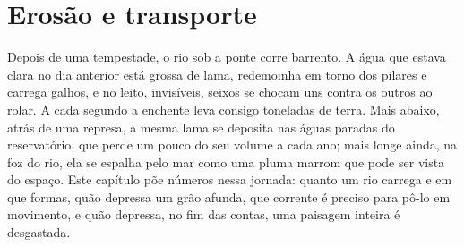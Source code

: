 \chapter{Erosão e transporte}\label{ch:b1:erosion-transport}

Depois de uma tempestade, o rio sob a ponte corre barrento. A água que estava clara no dia anterior está grossa de lama, redemoinha em torno dos pilares e carrega galhos, e no leito, invisíveis, seixos se chocam uns contra os outros ao rolar. A cada segundo a enchente leva consigo toneladas de terra. Mais abaixo, atrás de uma represa, a mesma lama se deposita nas águas paradas do reservatório, que perde um pouco do seu volume a cada ano; mais longe ainda, na foz do rio, ela se espalha pelo mar como uma pluma marrom que pode ser vista do espaço. Este capítulo põe números nessa jornada: quanto um rio carrega e em que formas, quão depressa um grão afunda, que corrente é preciso para pô-lo em movimento, e quão depressa, no fim das contas, uma paisagem inteira é desgastada.

